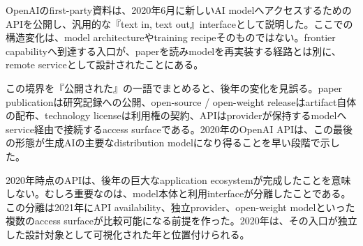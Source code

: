 OpenAIのfirst-party資料は、2020年6月に新しいAI modelへアクセスするためのAPIを公開し、汎用的な『text in, text out』interfaceとして説明した。ここでの構造変化は、model architectureやtraining recipeそのものではない。frontier capabilityへ到達する入口が、paperを読みmodelを再実装する経路とは別に、remote serviceとして設計されたことにある。\autocite{src-3b6a4c260e20}


この境界を『公開された』の一語でまとめると、後年の変化を見誤る。paper publicationは研究記録への公開、open-source / open-weight releaseはartifact自体の配布、technology licenseは利用権の契約、APIはproviderが保持するmodelへservice経由で接続するaccess surfaceである。2020年のOpenAI APIは、この最後の形態が生成AIの主要なdistribution modelになり得ることを早い段階で示した。\autocite{src-3b6a4c260e20}


2020年時点のAPIは、後年の巨大なapplication ecosystemが完成したことを意味しない。むしろ重要なのは、model本体と利用interfaceが分離したことである。この分離は2021年にAPI availability、独立provider、open-weight modelといった複数のaccess surfaceが比較可能になる前提を作った。2020年は、その入口が独立した設計対象として可視化された年と位置付けられる。\autocite{src-3b6a4c260e20}



